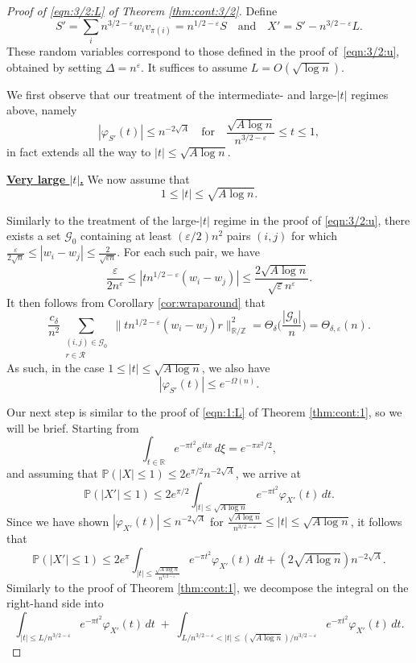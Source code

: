 \documentclass[reqno]{amsart}
\newcommand\R{{\mathbb{R}}}
\newcommand\Z{{\mathbb{Z}}}
\renewcommand\P{{\mathbb{P}}}
\newcommand\eps{{\varepsilon}}
\newcommand\CG{{\mathcal G}}
\newcommand\CR{{\mathcal R}}
\theoremstyle{plain}
\theoremstyle{definition}
\begin{document}
\begin{proof}[Proof of \eqref{eqn:3/2:L} of Theorem \ref{thm:cont:3/2}]
Define
\[
S' = \sum_{i} n^{3/2-\eps} w_i v_{\pi(i)} = n^{1/2-\eps} S
\quad \text{and} \quad
X' = S' - n^{3/2-\eps} L.
\]
These random variables correspond to those defined in the proof of~\eqref{eqn:3/2:u}, obtained by setting $\Delta = n^{\varepsilon}$. It suffices to assume $L = O(\sqrt{\log n})$.  

We first observe that our treatment of the intermediate- and large-$|t|$ regimes above, namely
\[
|\varphi_{S'}(t)| \le n^{-2\sqrt{A}} \quad \text{for} \quad \frac{\sqrt{A\log n}}{n^{3/2-\eps}} \le t \le 1,
\]
in fact extends all the way to $|t| \le \sqrt{A\log n}$.

\underline{\bf Very large $|t|$.}  We now assume that
\[
1 \le |t| \le \sqrt{A\log n}.
\]

Similarly to the treatment of the large-$|t|$ regime in the proof of \eqref{eqn:3/2:u}, there exists a set $\CG_{0}$ containing at least $(\eps/2)n^{2}$ pairs $(i,j)$ for which $\frac{\eps}{2\sqrt{n}} \le |w_{i} - w_{j}| \le \frac{2}{\sqrt{\eps n}}$. For each such pair, we have
\[
\frac{\eps}{2 n^{\eps}}\le |t n^{1/2-\eps} (w_{i}-w_{j})|\le \frac{2\sqrt{A\log n}}{\sqrt{\eps}n^{\eps}}.
\]
It then follows from Corollary \ref{cor:wraparound} that
\[
\frac{c_{\delta}}{n^{2}} \sum_{\substack{(i,j) \in \CG_{0}\\ r \in \CR}} 
\Big\| t n^{1/2-\eps} (w_{i}-w_{j}) r \Big\|_{\R/\Z}^{2} 
=\Theta_{\delta}\Big(\frac{|\CG_{0}|}{n}\Big) =\Theta_{\delta,\eps}(n).
\]
As such, in the case $1 \le |t| \le \sqrt{A\log n}$, we also have
\[
|\varphi_{S'}(t)| \le e^{-\Omega(n)}.
\]

\medskip
\noindent
Our next step is similar to the proof of \eqref{eqn:1:L} of Theorem \ref{thm:cont:1}, so we will be brief.  
Starting from
\[
\int_{t \in \R} e^{-\pi t^{2}} e^{i t x} \, d\xi = e^{-\pi x^{2}/2},
\]
and assuming that $\P(|X| \le 1) \le 2e^{\pi /2} n^{-2\sqrt{A}}$, we arrive at
\[
\P(|X'|\le 1) \le 2 e^{\pi/2} \int_{|t| \le \sqrt{A\log n}} e^{-\pi t^{2}} \varphi_{X'}(t) \, dt.
\]
Since we have shown $|\varphi_{X'}(t)| \le n^{-2\sqrt{A}}$ for $\frac{\sqrt{A\log n}}{n^{3/2-\eps}} \le |t| \le \sqrt{A\log n}$, it follows that
\[
\P(|X'|\le 1) \le 2 e^{\pi} \int_{|t| \le \frac{\sqrt{A\log n}}{n^{3/2-\eps}}} e^{-\pi t^{2}} \varphi_{X'}(t) \, dt + (2\sqrt{A\log n})n^{-2\sqrt{A}}.
\]
Similarly to the proof of Theorem \ref{thm:cont:1}, we decompose the integral on the right-hand side into
\[
\int_{|t| \le L/n^{3/2-\eps}} e^{-\pi t^{2}} \varphi_{X'}(t) \, dt
\;+\;
\int_{L/n^{3/2-\eps} < |t| \le (\sqrt{A\log n})/n^{3/2-\eps}} e^{-\pi t^{2}} \varphi_{X'}(t) \, dt.
\]


\end{proof}
\end{document}
